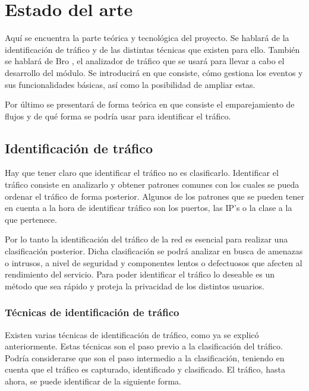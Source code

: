 \chapter{Estado del arte}\label{estadoarte}

Aquí se encuentra la parte teórica y tecnológica del proyecto. Se hablará de la identificación de tráfico y de 
las distintas técnicas que existen para ello. También se hablará de Bro \cite{broindex}, el 
analizador de tráfico que se usará para 
llevar a cabo el desarrollo del módulo. Se introducirá en que consiste, cómo gestiona los eventos y sus 
funcionalidades básicas, así como la posibilidad de ampliar estas.

\intro Por último se presentará de forma teórica en que consiste el emparejamiento de flujos y de qué forma 
se podría usar para identificar el tráfico.

\section{Identificación de tráfico}

Hay que tener claro que identificar el tráfico no es clasificarlo. Identificar el tráfico consiste en analizarlo 
y obtener patrones comunes con los cuales se pueda ordenar el tráfico de forma posterior. Algunos de los patrones 
que se pueden tener en cuenta a la hora de identificar tráfico son los puertos, las IP's o la clase a la que 
pertenece.

\intro Por lo tanto la identificación del tráfico de la red es esencial para realizar una clasificación 
posterior. Dicha clasificación se podrá analizar en busca de amenazas o intrusos, a nivel de seguridad 
y componentes lentos o defectuosos que afecten al rendimiento del servicio. Para poder identificar el 
tráfico lo deseable es un método que sea rápido y proteja la privacidad de los distintos usuarios.

\subsection{Técnicas de identificación de tráfico}

Existen varias técnicas de identificación de tráfico, como ya se explicó anteriormente. Estas técnicas son 
el paso previo a la clasificación del tráfico. Podría considerarse que son el paso intermedio a la clasificación, 
teniendo en cuenta que el tráfico es capturado, identificado y clasificado. El tráfico, hasta ahora, se puede identificar de la siguiente forma.

